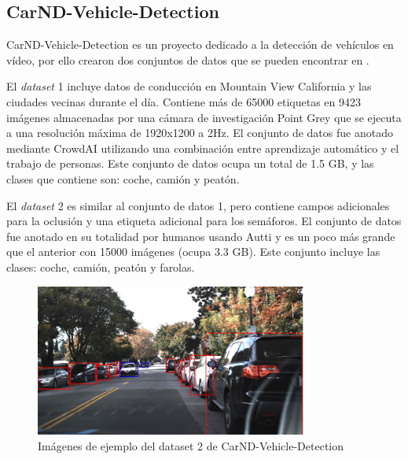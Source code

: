 \subsection{CarND-Vehicle-Detection}

CarND-Vehicle-Detection \cite{carnd1} es un proyecto dedicado a la detección de vehículos en vídeo, por ello crearon dos conjuntos de datos que se pueden encontrar en \cite{carnd2}.

El \textit{dataset} 1 incluye datos de conducción en Mountain View California y las ciudades vecinas durante el día. Contiene más de 65000 etiquetas en 9423 imágenes almacenadas por una cámara de investigación Point Grey que se ejecuta a una resolución máxima de 1920x1200 a 2Hz. El conjunto de datos fue anotado mediante CrowdAI utilizando una combinación entre aprendizaje automático y el trabajo de personas. Este conjunto de datos ocupa un total de 1.5 GB, y las clases que contiene son: coche, camión y peatón.

El \textit{dataset} 2 es similar al conjunto de datos 1, pero contiene campos adicionales para la oclusión y una etiqueta adicional para los semáforos. El conjunto de datos fue anotado en su totalidad por humanos usando Autti y es un poco más grande que el anterior con 15000 imágenes (ocupa 3.3 GB). Este conjunto incluye las clases: coche, camión, peatón y farolas.
\begin{figure}[H] 
\begin{center}
	\includegraphics[width=0.8\textwidth]{figures/Estado_arte/carnd_dataset2.png}
   \caption{Imágenes de ejemplo del dataset 2 de CarND-Vehicle-Detection}
	\label{fig.carnd}
\end{center}
\end{figure}
